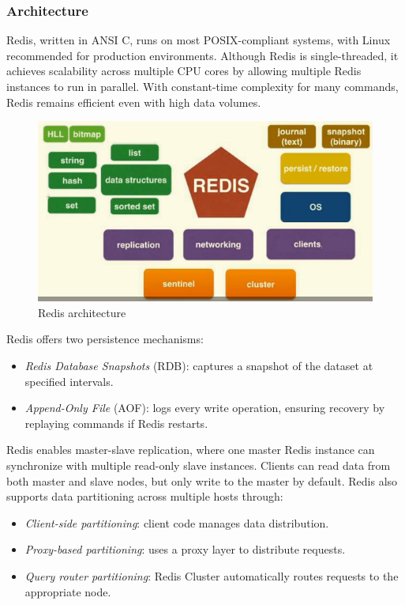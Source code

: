 \subsubsection{Architecture}
Redis, written in ANSI C, runs on most POSIX-compliant systems, with Linux recommended for production environments. 
Although Redis is single-threaded, it achieves scalability across multiple CPU cores by allowing multiple Redis instances to run in parallel. 
With constant-time complexity for many commands, Redis remains efficient even with high data volumes.
\begin{figure}[H]
    \centering
    \includegraphics[width=0.75\linewidth]{images/redis.png}
    \caption{Redis architecture}
\end{figure}
Redis offers two persistence mechanisms:
\begin{itemize}
    \item \textit{Redis Database Snapshots} (RDB): captures a snapshot of the dataset at specified intervals.
    \item \textit{Append-Only File} (AOF): logs every write operation, ensuring recovery by replaying commands if Redis restarts.
\end{itemize}
Redis enables master-slave replication, where one master Redis instance can synchronize with multiple read-only slave instances. 
Clients can read data from both master and slave nodes, but only write to the master by default. 
Redis also supports data partitioning across multiple hosts through:
\begin{itemize}
    \item \textit{Client-side partitioning}: client code manages data distribution.
    \item \textit{Proxy-based partitioning}: uses a proxy layer to distribute requests.
    \item \textit{Query router partitioning}: Redis Cluster automatically routes requests to the appropriate node.
\end{itemize}

